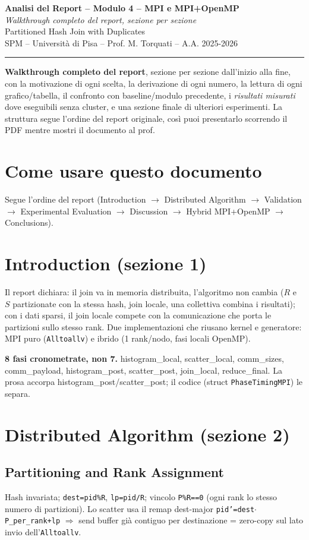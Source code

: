 \documentclass[11pt,a4paper]{article}
\newcommand{\doctitle}[2]{%
  \begin{titlepage}\centering\vspace*{2cm}
  {\LARGE\bfseries Analisi del Report -- #1\\[0.6em]}
  {\large\itshape #2}\\[1.5em]
  {\large Partitioned Hash Join with Duplicates}\\[0.4em]
  {\large SPM -- Università di Pisa -- Prof. M. Torquati -- A.A. 2025-2026}\\[2em]
  \hrule\vspace{1em}
  \begin{flushleft}\small \textbf{Walkthrough completo del report}, sezione per sezione dall'inizio alla fine, con la motivazione di ogni scelta, la derivazione di ogni numero, la lettura di ogni grafico/tabella, il confronto con baseline/modulo precedente, i \emph{risultati misurati} dove eseguibili senza cluster, e una sezione finale di ulteriori esperimenti. La struttura segue l'ordine del report originale, così puoi presentarlo scorrendo il PDF mentre mostri il documento al prof.\end{flushleft}
  \end{titlepage}
  \tableofcontents\newpage}
\begin{document}
\doctitle{Modulo 4 -- MPI e MPI+OpenMP}{Walkthrough completo del report, sezione per sezione}

\section*{Come usare questo documento}
Segue l'ordine del report (Introduction $\to$ Distributed Algorithm $\to$ Validation $\to$ Experimental Evaluation $\to$ Discussion $\to$ Hybrid MPI+OpenMP $\to$ Conclusions).

\section{Introduction (sezione 1)}

Il report dichiara: il join va in memoria distribuita, l'algoritmo non cambia ($R$ e $S$ partizionate con la stessa hash, join locale, una collettiva combina i risultati); con i dati sparsi, il join locale compete con la comunicazione che porta le partizioni sullo stesso rank. Due implementazioni che riusano kernel e generatore: MPI puro (\texttt{Alltoallv}) e ibrido (1 rank/nodo, fasi locali OpenMP).

\begin{difesa}
\textbf{8 fasi cronometrate, non 7.} histogram\_local, scatter\_local, comm\_sizes, comm\_payload, histogram\_post, scatter\_post, join\_local, reduce\_final. La prosa accorpa histogram\_post/scatter\_post; il codice (struct \texttt{PhaseTimingMPI}) le separa.
\end{difesa}

\section{Distributed Algorithm (sezione 2)}

\subsection{Partitioning and Rank Assignment}

\begin{motiv}
Hash invariata; \texttt{dest=pid\%R}, \texttt{lp=pid/R}; vincolo \texttt{P\%R==0} (ogni rank lo stesso numero di partizioni). Lo scatter usa il remap dest-major \texttt{pid'=dest$\cdot$P\_per\_rank+lp} $\Rightarrow$ send buffer già contiguo per destinazione = zero-copy sul lato invio dell'\texttt{Alltoallv}.
\end{motiv}
\end{document}
